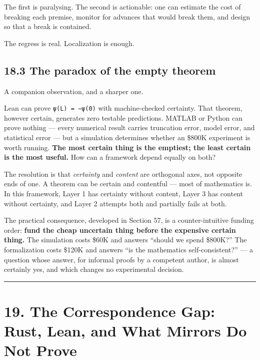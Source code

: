 \documentclass[
  11pt]{report}
\begin{document}
The first is paralysing. The second is actionable: one can estimate the
cost of breaking each premise, monitor for advances that would break
them, and design so that a break is contained.

The regress is real. Localization is enough.

\hypertarget{the-paradox-of-the-empty-theorem}{%
\section{18.3 The paradox of the empty
theorem}\label{the-paradox-of-the-empty-theorem}}

A companion observation, and a sharper one.

Lean can prove \texttt{ψ(L)\ =\ −ψ(0)} with machine-checked certainty.
That theorem, however certain, generates zero testable predictions.
MATLAB or Python can prove nothing --- every numerical result carries
truncation error, model error, and statistical error --- but a
simulation determines whether an \$800K experiment is worth running.
\textbf{The most certain thing is the emptiest; the least certain is the
most useful.} How can a framework depend equally on both?

The resolution is that \emph{certainty} and \emph{content} are
orthogonal axes, not opposite ends of one. A theorem can be certain and
contentful --- most of mathematics is. In this framework, Layer 1 has
certainty without content, Layer 3 has content without certainty, and
Layer 2 attempts both and partially fails at both.

The practical consequence, developed in Section 57, is a
counter-intuitive funding order: \textbf{fund the cheap uncertain thing
before the expensive certain thing.} The simulation costs \$60K and
answers ``should we spend \$800K?'' The formalization costs \$120K and
answers ``is the mathematics self-consistent?'' --- a question whose
answer, for informal proofs by a competent author, is almost certainly
yes, and which changes no experimental decision.

\begin{center}\rule{0.5\linewidth}{0.5pt}\end{center}

\hypertarget{the-correspondence-gap-rust-lean-and-what-mirrors-do-not-prove}{%
\chapter{19. The Correspondence Gap: Rust, Lean, and What Mirrors Do Not
Prove}\label{the-correspondence-gap-rust-lean-and-what-mirrors-do-not-prove}}
\end{document}
